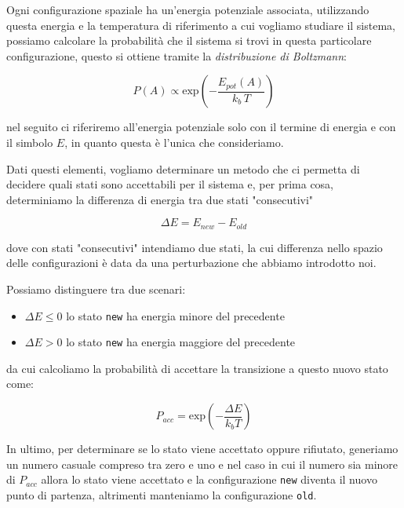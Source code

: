 Ogni configurazione spaziale ha un'energia potenziale associata, utilizzando questa energia e la temperatura di riferimento a cui vogliamo studiare il sistema, possiamo calcolare la probabilità che il sistema si trovi in questa particolare configurazione, questo si ottiene tramite la \textit{distribuzione di Boltzmann}:

\begin{equation}
    P(A) \propto \mathrm{exp}\left(-\frac{E_{pot}(A)}{k_b\,T}\right)
\end{equation}

nel seguito ci riferiremo all'energia potenziale solo con il termine di energia e con il simbolo $E$, in quanto questa è l'unica che consideriamo.

Dati questi elementi, vogliamo determinare un metodo che ci permetta di decidere quali stati sono accettabili per il sistema e, per prima cosa, determiniamo la differenza di energia tra due stati "consecutivi"

\begin{equation}
    \Delta E = E_{new} - E_{old}
\end{equation}

dove con stati "consecutivi" intendiamo due stati, la cui differenza nello spazio delle configurazioni è data da una perturbazione che abbiamo introdotto noi.

Possiamo distinguere tra due scenari:

\begin{itemize}
    \item $\Delta E \leq 0$ lo stato \texttt{new} ha energia minore del precedente
    \item $\Delta E > 0$ lo stato \texttt{new} ha energia maggiore del precedente
\end{itemize}

da cui calcoliamo la probabilità di accettare la transizione a questo nuovo stato come:

\begin{equation}
    P_{acc} = \mathrm{exp}\left(-\frac{\Delta E}{k_bT} \right)
\end{equation}

In ultimo, per determinare se lo stato viene accettato oppure rifiutato, generiamo un numero casuale compreso tra zero e uno e nel caso in cui il numero sia minore di $P_{acc}$ allora lo stato viene accettato e la configurazione \texttt{new} diventa il nuovo punto di partenza, altrimenti manteniamo la configurazione \texttt{old}.

